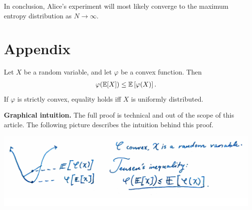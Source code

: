 \documentclass[13pt]{article}
\begin{document}
In conclusion, Alice's experiment will most likely converge to the maximum entropy distribution as $N \to \infty$.


\section*{Appendix}

\begin{theorem} Let $X$ be a random variable, and let $\varphi$ be a convex function.  Then
  \begin{align*}
    \varphi(\mathbb{E} [X]) \leq \mathbb{E} \left[ \varphi(X) \right].
  \end{align*}
  If $\varphi$ is strictly convex, equality holds iff $X$ is uniformly distributed.
\end{theorem}

{\bf Graphical intuition.} The full proof is technical and out of the scope of this article.  The following picture describes the intuition behind this proof.

\includegraphics[width=\textwidth]{img/jensen}



\nocite{*}

\end{document}
